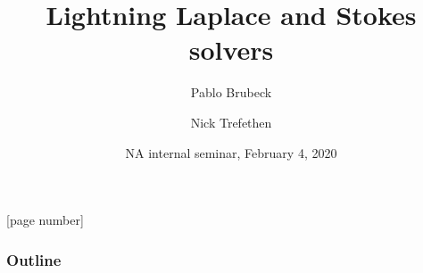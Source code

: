 \documentclass{beamer}
\title[Lightning Stokes]
{Lightning Laplace and Stokes solvers}
\author[P. Brubeck]{Pablo Brubeck \inst{1} \and Nick Trefethen \inst{1}}
\institute[Oxford]{
	\inst{1} Mathematical Institute, University of Oxford
}
\date{NA internal seminar, February 4, 2020}
\begin{document}

[page number]{}

\begin{frame}
\frametitle{Outline}
\tableofcontents
\end{frame}





\end{document}
